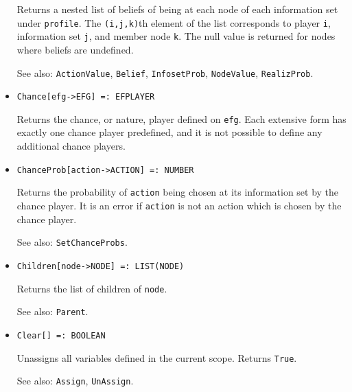 \begin{itemize}
\bd 
Returns a nested list of
beliefs of being at each node of each information set under
\verb+profile+. The \verb+(i,j,k)+th element of the list corresponds
to player \verb+i+, information set \verb+j+, and member node
\verb+k+. The null value is returned for nodes where beliefs are
undefined.

\item [See also:] \verb+ActionValue+, \verb+Belief+, \verb+InfosetProb+,
\verb+NodeValue+, \verb+RealizProb+.
\ed





\item{}
\protect \large \begin{verbatim}
Chance[efg->EFG] =: EFPLAYER 
\end{verbatim}\normalsize

\bd
Returns the chance, or nature, player defined on \verb+efg+.
Each extensive form has exactly one
chance player predefined, and it is not possible to define any additional
chance players.
\ed

\item{}
\protect \large \begin{verbatim}
ChanceProb[action->ACTION] =: NUMBER 
\end{verbatim}\normalsize

\bd
Returns the probability of \verb+action+ being chosen at its information
set by the chance player.  It is an error if \verb+action+ is not an action
which is chosen by the chance player.
\item [See also:] \verb+SetChanceProbs+.
\ed

\item{}
\protect \large \begin{verbatim} 
Children[node->NODE] =: LIST(NODE) 
\end{verbatim}\normalsize

\bd
Returns the list of children of \verb+node+.
\item [See also:] \verb+Parent+.
\ed

\item{}
\protect \large \begin{verbatim}
Clear[] =: BOOLEAN 
\end{verbatim}\normalsize

\bd
Unassigns all variables defined in the current scope.  Returns \verb+True+.
\item [See also:] \verb+Assign+, \verb+UnAssign+.
\ed


\end{itemize}
